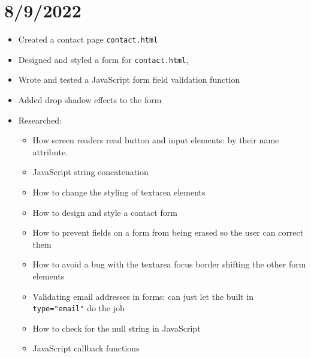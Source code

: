 \documentclass{article}
\begin{document}
\section*{8/9/2022}
\begin{itemize}
	\item Created a contact page \texttt{contact.html}
	\item Designed and styled a form for \texttt{contact.html}, 
	\item Wrote and tested a JavaScript form field validation function 
	\item Added drop shadow effects to the form
	\item Researched:
		\begin{itemize} 
	 			\item How screen readers read button and input elements: by their name attribute.
	 			\item JavaScript string concatenation
	 			\item How to change the styling of textarea elements
	 			\item How to design and style a contact form
	 			\item How to prevent fields on a form from being erased so the user can correct them
	 			\item How to avoid a bug with the textarea focus border shifting the other form elements
	 			\item Validating email addresses in forms: can just let the built in \texttt{type="email"} do the job
	 			\item How to check for the null string in JavaScript
	 			\item JavaScript callback functions

		\end{itemize}
\end{itemize}
\end{document}
